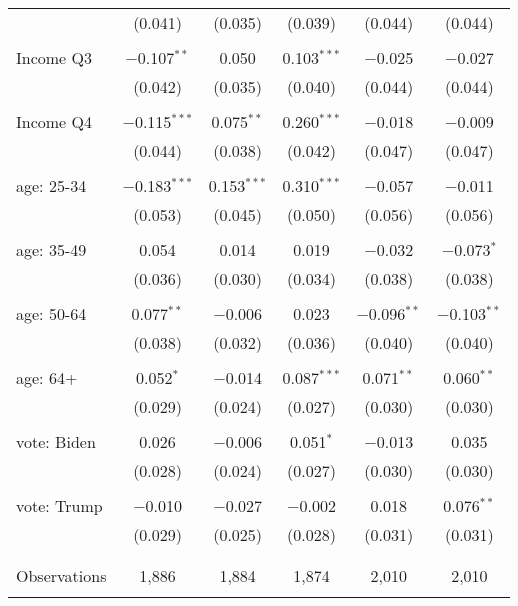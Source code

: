\begin{tabular}{@{\extracolsep{5pt}}lccccc}
  & (0.041) & (0.035) & (0.039) & (0.044) & (0.044) \\ 
  & & & & & \\ 
 Income Q3 & $-$0.107$^{**}$ & 0.050 & 0.103$^{***}$ & $-$0.025 & $-$0.027 \\ 
  & (0.042) & (0.035) & (0.040) & (0.044) & (0.044) \\ 
  & & & & & \\ 
 Income Q4 & $-$0.115$^{***}$ & 0.075$^{**}$ & 0.260$^{***}$ & $-$0.018 & $-$0.009 \\ 
  & (0.044) & (0.038) & (0.042) & (0.047) & (0.047) \\ 
  & & & & & \\ 
 age: 25-34 & $-$0.183$^{***}$ & 0.153$^{***}$ & 0.310$^{***}$ & $-$0.057 & $-$0.011 \\ 
  & (0.053) & (0.045) & (0.050) & (0.056) & (0.056) \\ 
  & & & & & \\ 
 age: 35-49 & 0.054 & 0.014 & 0.019 & $-$0.032 & $-$0.073$^{*}$ \\ 
  & (0.036) & (0.030) & (0.034) & (0.038) & (0.038) \\ 
  & & & & & \\ 
 age: 50-64 & 0.077$^{**}$ & $-$0.006 & 0.023 & $-$0.096$^{**}$ & $-$0.103$^{**}$ \\ 
  & (0.038) & (0.032) & (0.036) & (0.040) & (0.040) \\ 
  & & & & & \\ 
 age: 64+ & 0.052$^{*}$ & $-$0.014 & 0.087$^{***}$ & 0.071$^{**}$ & 0.060$^{**}$ \\ 
  & (0.029) & (0.024) & (0.027) & (0.030) & (0.030) \\ 
  & & & & & \\ 
 vote: Biden & 0.026 & $-$0.006 & 0.051$^{*}$ & $-$0.013 & 0.035 \\ 
  & (0.028) & (0.024) & (0.027) & (0.030) & (0.030) \\ 
  & & & & & \\ 
 vote: Trump & $-$0.010 & $-$0.027 & $-$0.002 & 0.018 & 0.076$^{**}$ \\ 
  & (0.029) & (0.025) & (0.028) & (0.031) & (0.031) \\ 
  & & & & & \\ 
\hline \\[-1.8ex] 

Observations & 1,886 & 1,884 & 1,874 & 2,010 & 2,010 \\ 
\hline 
\hline \\[-1.8ex] 
\end{tabular} 